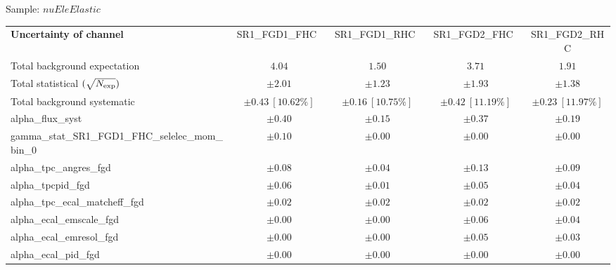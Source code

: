 
\begin{table}
{\large Sample: $nuEleElastic$}
\begin{center}
\setlength{\tabcolsep}{0.0pc}
\begin{tabular*}{\textwidth}{@{\extracolsep{\fill}}lcccc}
\noalign{\smallskip}\hline\noalign{\smallskip}
{\bf Uncertainty of channel}                                    & {\small SR1\_FGD1\_FHC}~~~           & {\small SR1\_FGD1\_RHC}~~~            & {\small SR1\_FGD2\_FHC}~~~            & {\small SR1\_FGD2\_RHC}            \\
\noalign{\smallskip}\hline\noalign{\smallskip}
Total background expectation             &  $4.04$        &  $1.50$        &  $3.71$        &  $1.91$       \\
\noalign{\smallskip}\hline\noalign{\smallskip}
Total statistical $(\sqrt{N_{\rm exp}})$              & $\pm 2.01$        & $\pm 1.23$        & $\pm 1.93$        & $\pm 1.38$       \\
Total background systematic               & $\pm 0.43\ [10.62\%] $        & $\pm 0.16\ [10.75\%] $        & $\pm 0.42\ [11.19\%] $        & $\pm 0.23\ [11.97\%] $             \\
\noalign{\smallskip}\hline\noalign{\smallskip}
\noalign{\smallskip}\hline\noalign{\smallskip}
alpha\_flux\_syst         & $\pm 0.40$          & $\pm 0.15$          & $\pm 0.37$          & $\pm 0.19$       \\
gamma\_stat\_SR1\_FGD1\_FHC\_selelec\_mom\_bin\_0         & $\pm 0.10$          & $\pm 0.00$          & $\pm 0.00$          & $\pm 0.00$       \\
alpha\_tpc\_angres\_fgd         & $\pm 0.08$          & $\pm 0.04$          & $\pm 0.13$          & $\pm 0.09$       \\
alpha\_tpcpid\_fgd         & $\pm 0.06$          & $\pm 0.01$          & $\pm 0.05$          & $\pm 0.04$       \\
alpha\_tpc\_ecal\_matcheff\_fgd         & $\pm 0.02$          & $\pm 0.02$          & $\pm 0.02$          & $\pm 0.02$       \\
alpha\_ecal\_emscale\_fgd         & $\pm 0.00$          & $\pm 0.00$          & $\pm 0.06$          & $\pm 0.04$       \\
alpha\_ecal\_emresol\_fgd         & $\pm 0.00$          & $\pm 0.00$          & $\pm 0.05$          & $\pm 0.03$       \\
alpha\_ecal\_pid\_fgd         & $\pm 0.00$          & $\pm 0.00$          & $\pm 0.00$          & $\pm 0.00$       \\

\end{tabular*}
\end{center}
\end{table}
